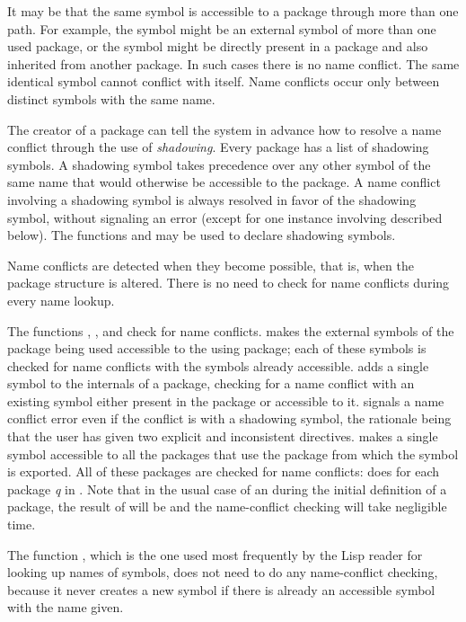 It may be that the same symbol is accessible to a package through more than
one path.  For example, the symbol might be
an external symbol of more than one used package, or the symbol
might be directly present in a package and also inherited from
another package.
In such cases there is no name conflict.
The same identical symbol cannot conflict with itself.
Name conflicts occur only between distinct symbols with
the same name.

The creator of a package can tell the system in advance how to resolve a
name conflict through the use of \emph{shadowing}.  Every package has a
list of shadowing symbols.  A shadowing symbol takes precedence over any
other symbol of the same name that would otherwise be accessible to the
package.  A name conflict involving a shadowing symbol is always
resolved in favor of the shadowing symbol, without signaling an error
(except for one instance involving  described below).  The
functions  and  may be used to declare
shadowing symbols.

Name conflicts are detected when they become possible, that is, when the
package structure is altered.  There is no need to check for name
conflicts during every name lookup.

The functions , , and  check for name
conflicts.   makes the external symbols of the package
being used accessible to the using package; each of these symbols is
checked for name conflicts with the symbols already accessible.
 adds a single symbol to the internals of a package, checking
for a name conflict with an existing symbol either present in the
package or accessible to it.   signals a name conflict error
even if the conflict is with a shadowing symbol, the rationale being
that the user has given two explicit and inconsistent directives.
 makes a single
symbol accessible to all the packages that use the package from which
the symbol is exported.  All of these packages are checked for
name conflicts:   does
 for each package \emph{q}
in .  Note that in the usual case of
an  during the initial definition of a package, the
result of 
will be {\false} and the name-conflict checking
will take negligible time.

The function , which is the one used most
frequently by the Lisp reader for looking up names of symbols,
does not need to do any name-conflict checking, because it
never creates a new symbol if there is already an accessible symbol with
the name given.

